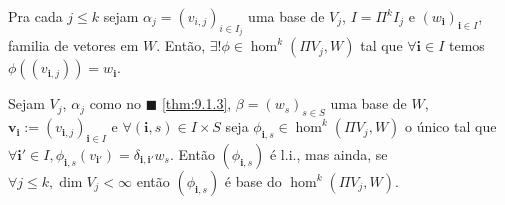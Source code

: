 \begin{theorem}
    \label{thm:9.1.3}
    Pra cada \(j\leq k\) sejam \(\alpha_j = (v_{i,j})_{i \in I_j}\) uma base de \(V_j\), \(I = \Pi^k I_j\) e \((w_\textbf{i})_{\textbf{i} \in I}\), familia de vetores em \(W\). Então, \(\exists ! \phi \in \hom^k(\Pi V_j, W)\) tal que \(\forall \textbf{i} \in I\) temos \(\phi((v_{\textbf{i}, j})) = w_\textbf{i}\). 
\end{theorem}


\begin{proposition}
    Sejam \(V_j\), \(\alpha_j\) como no \(\blacksquare\) \ref{thm:9.1.3}, \(\beta = (w_s)_{s\in S}\) uma base de \(W\), \(\textbf{v}_\textbf{i}:= (v_{\textbf{i},j})_{\textbf{i} \in I}\) e \(\forall (\textbf{i}, s) \in I \times S\) seja \(\phi_{\textbf{i}, s} \in \hom^k(\Pi V_j, W)\) o único tal que \(\forall \textbf{i}' \in I, \phi_{\textbf{i},s}(v_{\textbf{i}'}) = \delta_{\textbf{i}, \textbf{i}'} w_s\). Então \((\phi_{\textbf{i}, s})\) é l.i., mas ainda, se \(\forall j\leq k, \dim V_j < \infty \) então \((\phi_{\textbf{i}, s})\) é base do \(\hom^k(\Pi V_j, W)\). 
\end{proposition}

